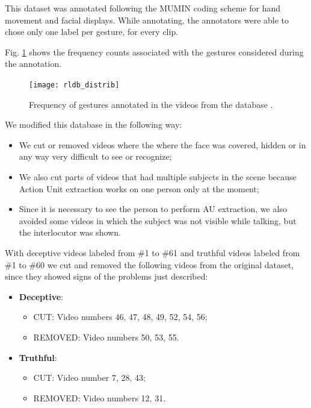 This dataset was annotated following the MUMIN coding scheme for hand movement and facial displays. While annotating, the annotators were able to chose only one label per gesture, for every clip.

Fig. \ref{fig:rldb_distrib} shows the frequency counts associated with the gestures considered during the annotation.

\begin{figure}[H]
	\centering
	\texttt{[image: rldb\_distrib]}
	\caption{Frequency of gestures annotated in the videos from the database \cite{Perez-Rosas:2015:DDU:2818346.2820758}.}
	\label{fig:rldb_distrib}
\end{figure}

We modified this database in the following way:
\begin{itemize}
	\item We cut or removed videos where the where the face was covered, hidden or in  any way very difficult to see or recognize;
	\item We also cut parts of videos that had multiple subjects in the scene because Action Unit extraction works on one person only at the moment;
	\item Since it is necessary to see the person to perform AU extraction, we also avoided some videos in which the subject was not visible while talking, but the interlocutor was shown.
\end{itemize}

With deceptive videos labeled from \#1 to \#61 and truthful videos labeled from \#1 to \#60 we cut and removed the following videos from the original dataset, since they showed signs of the problems just described:

\clearpage

\begin{itemize}
	\item \textbf{Deceptive}:
	\begin{itemize}
		\item CUT: Video numbers 46, 47, 48, 49, 52, 54, 56;
		\item REMOVED: Video numbers 50, 53,  55.
	\end{itemize}
	\item \textbf{Truthful}:
	\begin{itemize}
		\item CUT: Video number 7, 28, 43;
		\item REMOVED: Video numbers 12, 31. 
	\end{itemize}
\end{itemize}


